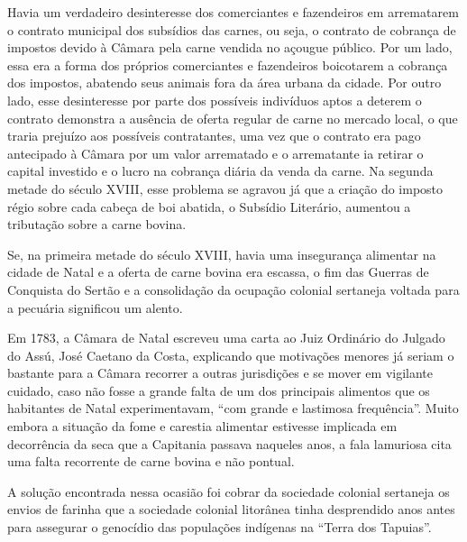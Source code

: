 \begin{refsection}
Havia um verdadeiro desinteresse dos comerciantes e fazendeiros em arrematarem o contrato municipal dos subsídios das carnes, ou seja, o contrato de cobrança de impostos devido à Câmara pela carne vendida no açougue público. Por um lado, essa era a forma dos próprios comerciantes e fazendeiros boicotarem a cobrança dos impostos, abatendo seus animais fora da área urbana da cidade. Por outro lado, esse desinteresse por parte dos possíveis indivíduos aptos a deterem o contrato demonstra a ausência de oferta regular de carne no mercado local, o que traria prejuízo aos possíveis contratantes, uma vez que o contrato era pago antecipado à Câmara por um valor arrematado e o arrematante ia retirar o capital investido e o lucro na cobrança diária da venda da carne. Na segunda metade do século XVIII, esse problema se agravou já que a criação do imposto régio sobre cada cabeça de boi abatida, o Subsídio Literário, aumentou a tributação sobre a carne bovina.

Se, na primeira metade do século XVIII, havia uma insegurança alimentar na cidade de Natal e a oferta de carne bovina era escassa, o fim das Guerras de Conquista do Sertão e a consolidação da ocupação colonial sertaneja voltada para a pecuária significou um alento.

Em 1783, a Câmara de Natal escreveu uma carta ao Juiz Ordinário do Julgado do Assú, José Caetano da Costa, explicando que motivações menores já seriam o bastante para a Câmara recorrer a outras jurisdições e se mover em vigilante cuidado, caso não fosse a grande falta de um dos principais alimentos que os habitantes de Natal experimentavam, “com grande e lastimosa frequência”. Muito embora a situação da fome e carestia alimentar estivesse implicada em decorrência da seca que a Capitania passava naqueles anos, a fala lamuriosa cita uma falta recorrente de carne bovina e não pontual.

A solução encontrada nessa ocasião foi cobrar da sociedade colonial sertaneja os envios de farinha que a sociedade colonial litorânea tinha desprendido anos antes para assegurar o genocídio das populações indígenas na ``Terra dos Tapuias''.


\end{refsection}
